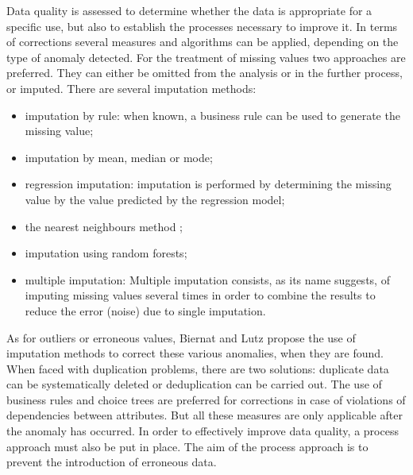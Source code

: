 Data quality is assessed to determine whether the data is appropriate for a specific use, but also to establish the processes necessary to improve it. In terms of corrections several measures and algorithms can be applied, depending on the type of anomaly detected. For the treatment of missing values two approaches are preferred\cite{glassoncicognani}.
They can either be omitted from the analysis or in the further process, or imputed.  There are several imputation methods: 
\begin{itemize}[parsep=0cm,itemsep=0cm]
    \item imputation by rule: when known, a business rule can be used to generate the missing value;
    \item imputation by mean, median or mode;
    \item regression imputation: imputation is performed by determining the missing value by the value predicted by the regression model; 
    \item the nearest neighbours method ;
    \item imputation using random forests;
    \item multiple imputation: Multiple imputation consists, as its name suggests, of imputing missing values several times in order to combine the results to reduce the error (noise) due to single imputation.
\end{itemize}
As for outliers or erroneous values, Biernat and Lutz \cite{datascience} propose the use of imputation methods to correct these various anomalies, when they are found. When faced with duplication problems, there are two solutions: duplicate data can be systematically deleted or deduplication can be carried out. The use of business rules and choice trees are  preferred for corrections in case of violations of dependencies between attributes. But all these measures are only applicable after the anomaly has occurred. In order to effectively improve data quality, a process approach must also be put in place. The aim of the process approach is to prevent the introduction of erroneous data. 


